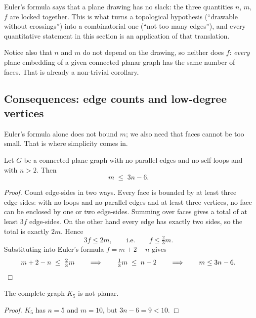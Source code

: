 \begin{intuition}
Euler's formula says that a plane drawing has no slack: the three quantities
$n$, $m$, $f$ are locked together. This is what turns a topological hypothesis
(``drawable without crossings'') into a combinatorial one (``not too many
edges''), and every quantitative statement in this section is an application of
that translation.

Notice also that $n$ and $m$ do not depend on the drawing, so neither does $f$:
\emph{every} plane embedding of a given connected planar graph has the same
number of faces. That is already a non-trivial corollary.
\end{intuition}

\subsection{Consequences: edge counts and low-degree vertices}\label{sec:planar-sparsity}

Euler's formula alone does not bound $m$; we also need that faces cannot be
too small. That is where simplicity comes in.

\begin{corollary}\label{cor:planar-3n-6}
Let $G$ be a connected plane graph with no parallel edges and no self-loops
and with $n > 2$. Then
\[
  m \;\le\; 3n - 6 .
\]
\end{corollary}

\begin{proof}
Count edge-sides in two ways. Every face is bounded by at least three
edge-sides: with no loops and no parallel edges and at least three vertices,
no face can be enclosed by one or two edge-sides. Summing over faces gives a
total of at least $3f$ edge-sides. On the other hand every edge has exactly two
sides, so the total is exactly $2m$. Hence
\[
  3f \le 2m, \qquad\text{i.e.}\qquad f \le \tfrac{2}{3}m .
\]
Substituting into Euler's formula $f = m + 2 - n$ gives
\[
  m + 2 - n \;\le\; \tfrac{2}{3} m
  \qquad\Longrightarrow\qquad
  \tfrac{1}{3} m \;\le\; n - 2
  \qquad\Longrightarrow\qquad
  m \le 3n - 6 . \qedhere
\]
\end{proof}

\begin{corollary}\label{cor:planar-k5}
The complete graph $K_5$ is not planar.
\end{corollary}

\begin{proof}
$K_5$ has $n = 5$ and $m = 10$, but $3n - 6 = 9 < 10$.
\end{proof}

